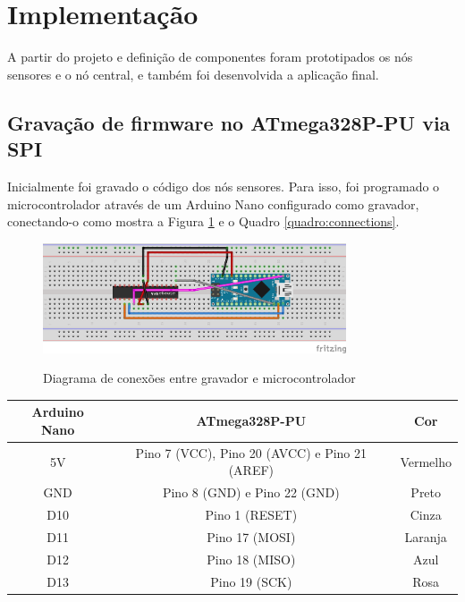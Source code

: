 \documentclass[oneside,openright,12pt]{ufsm_2015} %
\begin{document}
    \section{Implementação}
    A partir do projeto e definição de componentes foram prototipados os nós sensores e o nó central, e também foi desenvolvida a aplicação final.
    
    \subsection{Gravação de firmware no ATmega328P-PU via SPI}
    Inicialmente foi gravado o código dos nós sensores. Para isso, foi programado o microcontrolador através de um Arduino Nano configurado como gravador, conectando-o como mostra a Figura \ref{fig:gravador-sensor-node} e o Quadro \ref{quadro:connections}. 
    
    \begin{figure}[ht]
 	    \caption{\label{exepretex} Diagrama de conexões entre gravador e microcontrolador}
        \centering
        \includegraphics[width=0.8\textwidth]{figuras/firmware-programmer_bb.png}
        \vspace{\baselineskip} %
        \label{fig:gravador-sensor-node}
    \end{figure}
    
    \begin{quadro}
   	    \caption{Conexões para gravação de \textit{firmware}}
	    \centering
	    \begin{tabular}{| c | c | c | }
	    \hline
	    Arduino Nano & ATmega328P-PU & Cor\\
	    \hline
	    5V & Pino 7 (VCC), Pino 20 (AVCC) e Pino 21 (AREF) & Vermelho\\
	    \hline
	    GND & Pino 8 (GND) e Pino 22 (GND) & Preto\\
	    \hline
	    D10 & Pino 1 (RESET) & Cinza\\
	    \hline
	    D11 & Pino 17 (MOSI) & Laranja\\
	    \hline
	    D12 & Pino 18 (MISO) & Azul\\
	    \hline
	    D13 & Pino 19 (SCK) & Rosa\\
	    \hline
	    \end{tabular}
	    \vspace{\baselineskip} %
	    \label{quadro:connections}
\end{quadro}
    
\end{document}
